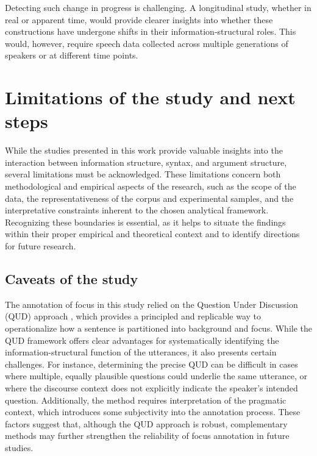\hspace*{-1pt}Detecting such change in progress is challenging. A longitudinal study, wheth\-er in real or apparent time, would provide clearer insights into whether these constructions have undergone shifts in their information-structural roles. This would, however, require speech data collected across multiple generations of speakers or at different time points.

\section{Limitations of the study and next steps} \label{sub:7.5}

While the studies presented in this work provide valuable insights into the interaction between information structure, syntax, and argument structure, several limitations must be acknowledged. These limitations concern both methodological and empirical aspects of the research, such as the scope of the data, the representativeness of the corpus and experimental samples, and the interpretative constraints inherent to the chosen analytical framework. Recognizing these boundaries is essential, as it helps to situate the findings within their proper empirical and theoretical context and to identify directions for future research. 

\subsection{Caveats of the study} \label{sub:7.5.1}

The annotation of focus in this study relied on the Question Under Discussion (QUD) approach \parencite{riester2019constructing}, which provides a principled and replicable way to operationalize how a sentence is partitioned into background and focus. While the QUD framework offers clear advantages for systematically identifying the information-structural function of the utterances, it also presents certain challenges. For instance, determining the precise QUD can be difficult in cases where multiple, equally plausible questions could underlie the same utterance, or where the discourse context does not explicitly indicate the speaker's intended question. Additionally, the method requires interpretation of the pragmatic context, which introduces some subjectivity into the annotation process. These factors suggest that, although the QUD approach is robust, complementary methods may further strengthen the reliability of focus annotation in future studies.

